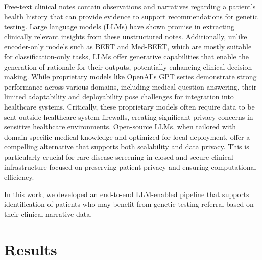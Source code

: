 \documentclass[fleqn,10pt]{wlscirep}
\begin{document}
Free-text clinical notes contain observations and narratives regarding a patient’s health history that can provide evidence to support recommendations for genetic testing. Large language models (LLMs) have shown promise in extracting clinically relevant insights from these unstructured notes.\cite{clusmann2023future,behari2024decision,thirunavukarasu2023large,huang2024critical} Additionally, unlike encoder-only models such as BERT and Med-BERT,\cite{devlin2019bert,rasmy2021med} which are mostly suitable for classification-only tasks, LLMs offer generative capabilities that enable the generation of rationale for their outputs, potentially enhancing clinical decision-making. While proprietary models like OpenAI’s GPT series demonstrate strong performance across various domains, including medical question answering, their limited adaptability and deployability pose challenges for integration into healthcare systems. Critically, these proprietary models often require data to be sent outside healthcare system firewalls, creating significant privacy concerns in sensitive healthcare environments. Open-source LLMs, when tailored with domain-specific medical knowledge and optimized for local deployment, offer a compelling alternative that supports both scalability and data privacy. This is particularly crucial for rare disease screening in closed and secure clinical infrastructure focused on preserving patient privacy and ensuring computational efficiency.

In this work, we developed an end-to-end LLM-enabled pipeline that supports identification of patients who may benefit from genetic testing referral based on their clinical narrative data.



\section*{Results}
\end{document}
